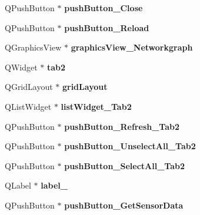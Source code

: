 \begin{DoxyCompactItemize}
Q\+Push\+Button $\ast$ {\bfseries push\+Button\+\_\+\+Close}
\item 
\mbox{\label{classUi__MainWindow_aa3f7b4cd4751d2908d9a393a6f532871}} 
Q\+Push\+Button $\ast$ {\bfseries push\+Button\+\_\+\+Reload}
\item 
\mbox{\label{classUi__MainWindow_aaf30ffdaee7f17ec714c23d3cc8cd72f}} 
Q\+Graphics\+View $\ast$ {\bfseries graphics\+View\+\_\+\+Networkgraph}
\item 
\mbox{\label{classUi__MainWindow_a6bd8df35117fe1ea53412b4795bfabe6}} 
Q\+Widget $\ast$ {\bfseries tab2}
\item 
\mbox{\label{classUi__MainWindow_a525ed3c5fe0784ac502ee222fba4e205}} 
Q\+Grid\+Layout $\ast$ {\bfseries grid\+Layout}
\item 
\mbox{\label{classUi__MainWindow_a44f257ea1e3b4474c8db252f3caa9207}} 
Q\+List\+Widget $\ast$ {\bfseries list\+Widget\+\_\+\+Tab2}
\item 
\mbox{\label{classUi__MainWindow_a61ee4132cc3822b8dd54405b7c387fce}} 
Q\+Push\+Button $\ast$ {\bfseries push\+Button\+\_\+\+Refresh\+\_\+\+Tab2}
\item 
\mbox{\label{classUi__MainWindow_a13dbef92b5f45eb9e7898d831e16a27a}} 
Q\+Push\+Button $\ast$ {\bfseries push\+Button\+\_\+\+Unselect\+All\+\_\+\+Tab2}
\item 
\mbox{\label{classUi__MainWindow_a8b417fc8924345e3bf587e144eb2d7b6}} 
Q\+Push\+Button $\ast$ {\bfseries push\+Button\+\_\+\+Select\+All\+\_\+\+Tab2}
\item 
\mbox{\label{classUi__MainWindow_a2e2516d755e4dd53fc905dabddf2738a}} 
Q\+Label $\ast$ {\bfseries label\+\_}
\item 
\mbox{\label{classUi__MainWindow_a3cca9f9ff9da892d7c132679e39554dc}} 
Q\+Push\+Button $\ast$ {\bfseries push\+Button\+\_\+\+Get\+Sensor\+Data}
\item 
\mbox{\label{classUi__MainWindow_a0e90c7e9ad77386881e0b264ddb9dd22}} 

\end{DoxyCompactItemize}
